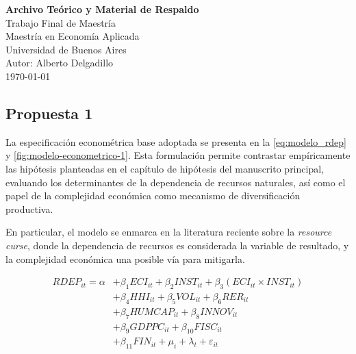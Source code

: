 \documentclass[12pt]{article}
\begin{document}
	
	
	\begin{center}
		
		\vspace*{2cm}
		
		{\Large \textbf{Archivo Teórico y Material de Respaldo}}\\[1cm]
		
		{\large Trabajo Final de Maestría}\\[0.5cm]
		
		{\normalsize Maestría en Economía Aplicada}\\
		{\normalsize Universidad de Buenos Aires}\\[1.5cm]
		
		{\normalsize Autor: Alberto Delgadillo}\\[0.3cm]
		
		{\normalsize \today}
		
		\vfill
		
	\end{center}
	
	
		\subsection{Propuesta 1}
	\label{subsec:modelo-econometrico-1}
	
	La especificación econométrica base adoptada se presenta en la \autoref{eq:modelo_rdep} y \autoref{fig:modelo-econometrico-1}. Esta formulación permite contrastar empíricamente las hipótesis planteadas en el capítulo de hipótesis del manuscrito principal, evaluando los determinantes de la dependencia de recursos naturales, así como el papel de la complejidad económica como mecanismo de diversificación productiva.
	
	En particular, el modelo se enmarca en la literatura reciente sobre la \textit{resource curse}, donde la dependencia de recursos es considerada la variable de resultado, y la complejidad económica una posible vía para mitigarla.
	
	\begin{equation}
		\label{eq:modelo_rdep}
		\begin{split}
			RDEP_{it} = \alpha 
			&+ \beta_1 ECI_{it} 
			+ \beta_2 INST_{it} 
			+ \beta_3 (ECI_{it} \times INST_{it}) \\
			&+ \beta_4 HHI_{it}
			+ \beta_5 VOL_{it} 
			+ \beta_6 RER_{it} \\
			&+ \beta_7 HUMCAP_{it} 
			+ \beta_8 INNOV_{it} \\
			&+ \beta_9 GDPPC_{it} 
			+ \beta_{10} FISC_{it} \\
			&+ \beta_{11} FIN_{it}
			+ \mu_i + \lambda_t + \varepsilon_{it}
		\end{split}
	\end{equation}
	
\end{document}
